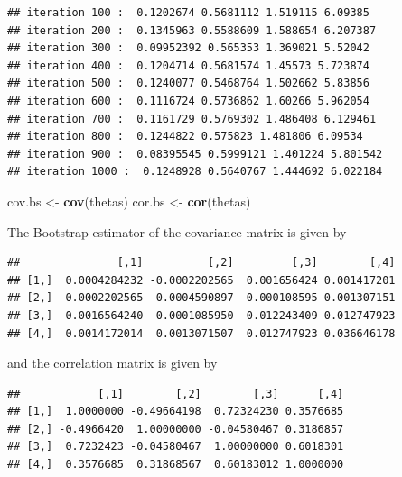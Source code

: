 \documentclass[
]{article}
\newenvironment{Shaded}{\begin{snugshade}}{\end{snugshade}}
\newcommand{\FunctionTok}[1]{\textcolor[rgb]{0.13,0.29,0.53}{\textbf{#1}}}
\newcommand{\NormalTok}[1]{#1}
\newcommand{\OtherTok}[1]{\textcolor[rgb]{0.56,0.35,0.01}{#1}}
\begin{document}
\begin{verbatim}
## iteration 100 :  0.1202674 0.5681112 1.519115 6.09385 
## iteration 200 :  0.1345963 0.5588609 1.588654 6.207387 
## iteration 300 :  0.09952392 0.565353 1.369021 5.52042 
## iteration 400 :  0.1204714 0.5681574 1.45573 5.723874 
## iteration 500 :  0.1240077 0.5468764 1.502662 5.83856 
## iteration 600 :  0.1116724 0.5736862 1.60266 5.962054 
## iteration 700 :  0.1161729 0.5769302 1.486408 6.129461 
## iteration 800 :  0.1244822 0.575823 1.481806 6.09534 
## iteration 900 :  0.08395545 0.5999121 1.401224 5.801542 
## iteration 1000 :  0.1248928 0.5640767 1.444692 6.022184
\end{verbatim}

\begin{Shaded}
\begin{Highlighting}[]
\NormalTok{cov.bs }\OtherTok{\textless{}{-}} \FunctionTok{cov}\NormalTok{(thetas)}
\NormalTok{cor.bs }\OtherTok{\textless{}{-}} \FunctionTok{cor}\NormalTok{(thetas)}
\end{Highlighting}
\end{Shaded}

The Bootstrap estimator of the covariance matrix is given by

\begin{verbatim}
##               [,1]          [,2]         [,3]        [,4]
## [1,]  0.0004284232 -0.0002202565  0.001656424 0.001417201
## [2,] -0.0002202565  0.0004590897 -0.000108595 0.001307151
## [3,]  0.0016564240 -0.0001085950  0.012243409 0.012747923
## [4,]  0.0014172014  0.0013071507  0.012747923 0.036646178
\end{verbatim}

and the correlation matrix is given by

\begin{verbatim}
##            [,1]        [,2]        [,3]      [,4]
## [1,]  1.0000000 -0.49664198  0.72324230 0.3576685
## [2,] -0.4966420  1.00000000 -0.04580467 0.3186857
## [3,]  0.7232423 -0.04580467  1.00000000 0.6018301
## [4,]  0.3576685  0.31868567  0.60183012 1.0000000
\end{verbatim}
\end{document}
